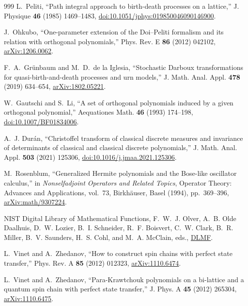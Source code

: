 \documentclass[a4paper,11pt]{article}
\theoremstyle{definition}
\theoremstyle{remark}
\begin{document}
\begin{thebibliography}{999}
L.~Peliti, ``Path integral approach to birth-death processes on a lattice,'' J. Physique \textbf{46} (1985) 1469--1483,
\href{https://doi.org/10.1051/jphys:019850046090146900}{doi:10.1051/jphys:019850046090146900}.

J.~Ohkubo, ``One-parameter extension of the Doi--Peliti formalism and its relation with orthogonal polynomials,'' Phys. Rev. E \textbf{86} (2012) 042102, \href{https://arxiv.org/abs/1206.0062}{arXiv:1206.0062}.

F.~A.~Gr\"unbaum and M.~D.~de la Iglesia,
``Stochastic Darboux transformations for quasi-birth-and-death processes and urn models,''
J. Math. Anal. Appl. \textbf{478} (2019) 634--654,
\href{https://arxiv.org/abs/1802.05221}{arXiv:1802.05221}.

W.~Gautschi and S.~Li,
``A set of orthogonal polynomials induced by a given orthogonal polynomial,''
Aequationes Math. \textbf{46} (1993) 174--198,
\href{https://doi.org/10.1007/BF01834006}{doi:10.1007/BF01834006}.

A.~J. Dur\'an,
``Christoffel transform of classical discrete measures and invariance of determinants of classical and classical discrete polynomials,''
J. Math. Anal. Appl. \textbf{503} (2021) 125306,
\href{https://doi.org/10.1016/j.jmaa.2021.125306}{doi:10.1016/j.jmaa.2021.125306}.

M.~Rosenblum,
``Generalized Hermite polynomials and the Bose-like oscillator calculus,''
in \emph{Nonselfadjoint Operators and Related Topics},
Operator Theory: Advances and Applications, vol.~73,
Birkh\"auser, Basel (1994), pp.~369--396,
\href{https://arxiv.org/abs/math/9307224}{arXiv:math/9307224}.

NIST Digital Library of Mathematical Functions,
\newblock F.~W.~J. Olver, A.~B. Olde Daalhuis, D.~W. Lozier, B.~I. Schneider, R.~F. Boisvert, C.~W. Clark, B.~R. Miller, B.~V. Saunders, H.~S. Cohl, and M.~A. McClain, eds.,
\newblock \href{https://dlmf.nist.gov/}{DLMF}.

L.~Vinet and A.~Zhedanov,
``How to construct spin chains with perfect state transfer,''
Phys. Rev. A \textbf{85} (2012) 012323,
\href{https://arxiv.org/abs/1110.6474}{arXiv:1110.6474}.

L.~Vinet and A.~Zhedanov,
``Para-Krawtchouk polynomials on a bi-lattice and a quantum spin chain with perfect state transfer,''
J. Phys. A \textbf{45} (2012) 265304,
\href{https://arxiv.org/abs/1110.6475}{arXiv:1110.6475}.


\end{thebibliography}
\end{document}
